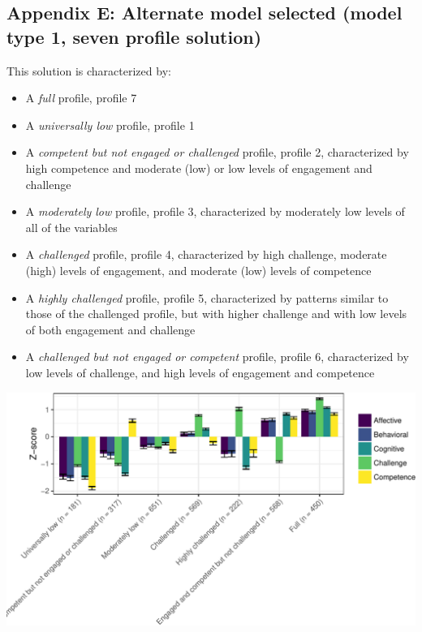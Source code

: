 \documentclass[]{book}
\providecommand{\tightlist}{%
  \setlength{\itemsep}{0pt}\setlength{\parskip}{0pt}}
\theoremstyle{definition}
\theoremstyle{definition}
\theoremstyle{definition}
\theoremstyle{remark}
\begin{document}
\subsection{Appendix E: Alternate model selected (model type 1, seven
profile
solution)}\label{appendix-e-alternate-model-selected-model-type-1-seven-profile-solution}

This solution is characterized by:

\begin{itemize}
\tightlist
\item
  A \emph{full} profile, profile 7
\item
  A \emph{universally low} profile, profile 1
\item
  A \emph{competent but not engaged or challenged} profile, profile 2,
  characterized by high competence and moderate (low) or low levels of
  engagement and challenge
\item
  A \emph{moderately low} profile, profile 3, characterized by
  moderately low levels of all of the variables
\item
  A \emph{challenged} profile, profile 4, characterized by high
  challenge, moderate (high) levels of engagement, and moderate (low)
  levels of competence
\item
  A \emph{highly challenged} profile, profile 5, characterized by
  patterns similar to those of the challenged profile, but with higher
  challenge and with low levels of both engagement and challenge
\item
  A \emph{challenged but not engaged or competent} profile, profile 6,
  characterized by low levels of challenge, and high levels of
  engagement and competence
\end{itemize}

\begin{center}\includegraphics[width=0.9\linewidth]{rosenberg-dissertation_files/figure-latex/m1_7p-1} \end{center}
\end{document}
